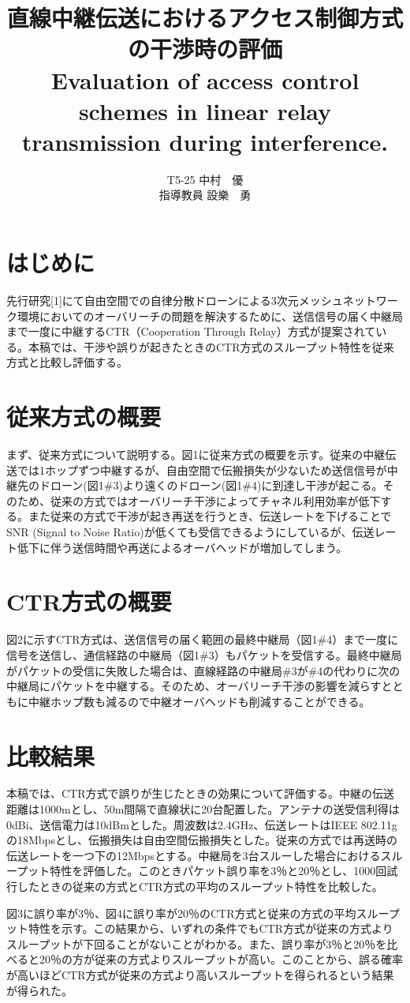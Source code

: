 \documentclass[a4paper,10pt]{ltjsarticle}
\title{\huge 直線中継伝送におけるアクセス制御方式の干渉時の評価\\
\Large Evaluation of access control schemes in linear relay transmission during interference.
}
\author{
T5-25 \:中村　優\\
指導教員 \: 設樂　勇
}
\date{}
\begin{document}
\twocolumn[
\maketitle
]

\section{はじめに}
先行研究[1]にて自由空間での自律分散ドローンによる3次元メッシュネットワーク環境においてのオーバリーチの問題を解決するために、送信信号の届く中継局まで一度に中継するCTR（Cooperation Through Relay）方式が提案されている。本稿では、干渉や誤りが起きたときのCTR方式のスループット特性を従来方式と比較し評価する。

\section{従来方式の概要}
まず、従来方式について説明する。図1に従来方式の概要を示す。従来の中継伝送では1ホップずつ中継するが、自由空間で伝搬損失が少ないため送信信号が中継先のドローン(図1\#3)より遠くのドローン(図1\#4)に到達し干渉が起こる。そのため、従来の方式ではオーバリーチ干渉によってチャネル利用効率が低下する。また従来の方式で干渉が起き再送を行うとき、伝送レートを下げることでSNR (Signal to Noise Ratio)が低くても受信できるようにしているが、伝送レート低下に伴う送信時間や再送によるオーバヘッドが増加してしまう。

\section{CTR方式の概要}
図2に示すCTR方式は、送信信号の届く範囲の最終中継局（図1\#4）まで一度に信号を送信し、通信経路の中継局（図1\#3）もパケットを受信する。最終中継局がパケットの受信に失敗した場合は、直線経路の中継局\#3が\#4の代わりに次の中継局にパケットを中継する。そのため、オーバリーチ干渉の影響を減らすとともに中継ホップ数も減るので中継オーバヘッドも削減することができる。

\section{比較結果}
本稿では、CTR方式で誤りが生じたときの効果について評価する。中継の伝送距離は1000mとし、50m間隔で直線状に20台配置した。アンテナの送受信利得は0dBi、送信電力は10dBmとした。周波数は2.4GHz、伝送レートはIEEE 802.11gの18Mbpsとし、伝搬損失は自由空間伝搬損失とした。従来の方式では再送時の伝送レートを一つ下の12Mbpsとする。中継局を3台スルーした場合におけるスループット特性を評価した。このときパケット誤り率を3％と20％とし、1000回試行したときの従来の方式とCTR方式の平均のスループット特性を比較した。

図3に誤り率が3％、図4に誤り率が20％のCTR方式と従来の方式の平均スループット特性を示す。この結果から、いずれの条件でもCTR方式が従来の方式よりスループットが下回ることがないことがわかる。また、誤り率が3％と20％を比べると20％の方が従来の方式よりスループットが高い。このことから、誤る確率が高いほどCTR方式が従来の方式より高いスループットを得られるという結果が得られた。


\end{document}
